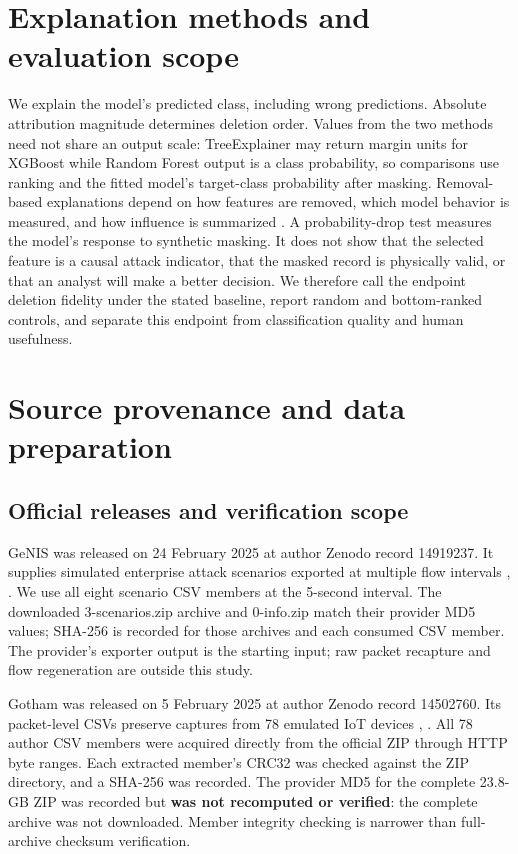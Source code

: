 \documentclass[journal,letterpaper]{IEEEtran}
\begin{document}
\section{Explanation methods and evaluation scope}
We explain the model's predicted class, including wrong predictions. Absolute attribution magnitude determines deletion order. Values from the two methods need not share an output scale: TreeExplainer may return margin units for XGBoost while Random Forest output is a class probability, so comparisons use ranking and the fitted model's target-class probability after masking. Removal-based explanations depend on how features are removed, which model behavior is measured, and how influence is summarized \cite{ref33}. A probability-drop test measures the model's response to synthetic masking. It does not show that the selected feature is a causal attack indicator, that the masked record is physically valid, or that an analyst will make a better decision. We therefore call the endpoint deletion fidelity under the stated baseline, report random and bottom-ranked controls, and separate this endpoint from classification quality and human usefulness.

\section{Source provenance and data preparation}
\subsection{Official releases and verification scope}
GeNIS was released on 24 February 2025 at author Zenodo record 14919237. It supplies simulated enterprise attack scenarios exported at multiple flow intervals \cite{ref1}, \cite{ref2}. We use all eight scenario CSV members at the 5-second interval. The downloaded 3-scenarios.zip archive and 0-info.zip match their provider MD5 values; SHA-256 is recorded for those archives and each consumed CSV member. The provider's exporter output is the starting input; raw packet recapture and flow regeneration are outside this study.

Gotham was released on 5 February 2025 at author Zenodo record 14502760. Its packet-level CSVs preserve captures from 78 emulated IoT devices \cite{ref3}, \cite{ref4}. All 78 author CSV members were acquired directly from the official ZIP through HTTP byte ranges. Each extracted member's CRC32 was checked against the ZIP directory, and a SHA-256 was recorded. The provider MD5 for the complete 23.8-GB ZIP was recorded but \textbf{was not recomputed or verified}: the complete archive was not downloaded. Member integrity checking is narrower than full-archive checksum verification.
\end{document}
